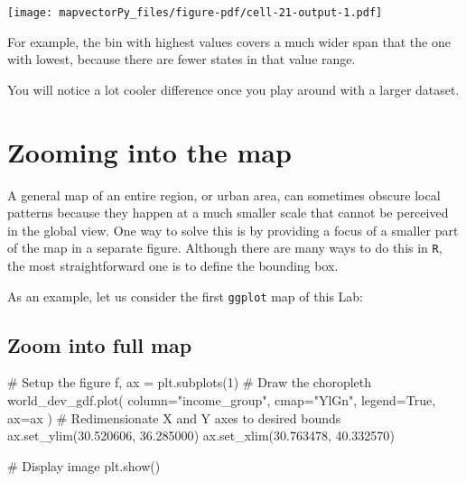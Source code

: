 \documentclass[
  letterpaper,
  DIV=11,
  numbers=noendperiod]{scrreprt}
\newenvironment{Shaded}{\begin{snugshade}}{\end{snugshade}}
\newcommand{\CommentTok}[1]{\textcolor[rgb]{0.37,0.37,0.37}{#1}}
\newcommand{\DecValTok}[1]{\textcolor[rgb]{0.68,0.00,0.00}{#1}}
\newcommand{\FloatTok}[1]{\textcolor[rgb]{0.68,0.00,0.00}{#1}}
\newcommand{\NormalTok}[1]{\textcolor[rgb]{0.00,0.23,0.31}{#1}}
\newcommand{\OperatorTok}[1]{\textcolor[rgb]{0.37,0.37,0.37}{#1}}
\newcommand{\StringTok}[1]{\textcolor[rgb]{0.13,0.47,0.30}{#1}}
\newcommand{\VariableTok}[1]{\textcolor[rgb]{0.07,0.07,0.07}{#1}}
\begin{document}
\texttt{[image: mapvectorPy\_files/figure-pdf/cell-21-output-1.pdf]}

For example, the bin with highest values covers a much wider span that
the one with lowest, because there are fewer states in that value range.

You will notice a lot cooler difference once you play around with a
larger dataset.

\section*{Zooming into the map}\label{zooming-into-the-map}


A general map of an entire region, or urban area, can sometimes obscure
local patterns because they happen at a much smaller scale that cannot
be perceived in the global view. One way to solve this is by providing a
focus of a smaller part of the map in a separate figure. Although there
are many ways to do this in \texttt{R}, the most straightforward one is
to define the bounding box.

As an example, let us consider the first \texttt{ggplot} map of this
Lab:

\subsection*{Zoom into full map}\label{zoom-into-full-map}

\begin{Shaded}
\begin{Highlighting}[]
\CommentTok{\# Setup the figure}
\NormalTok{f, ax }\OperatorTok{=}\NormalTok{ plt.subplots(}\DecValTok{1}\NormalTok{)}
\CommentTok{\# Draw the choropleth}
\NormalTok{world\_dev\_gdf.plot(}
\NormalTok{    column}\OperatorTok{=}\StringTok{"income\_group"}\NormalTok{, }
\NormalTok{    cmap}\OperatorTok{=}\StringTok{"YlGn"}\NormalTok{,}
\NormalTok{    legend}\OperatorTok{=}\VariableTok{True}\NormalTok{,}
\NormalTok{    ax}\OperatorTok{=}\NormalTok{ax}
\NormalTok{)}
\CommentTok{\# Redimensionate X and Y axes to desired bounds}
\NormalTok{ax.set\_ylim(}\FloatTok{30.520606}\NormalTok{, }\FloatTok{36.285000}\NormalTok{)}
\NormalTok{ax.set\_xlim(}\FloatTok{30.763478}\NormalTok{, }\FloatTok{40.332570}\NormalTok{)}

\CommentTok{\# Display image}
\NormalTok{plt.show()}
\end{Highlighting}
\end{Shaded}
\end{document}
